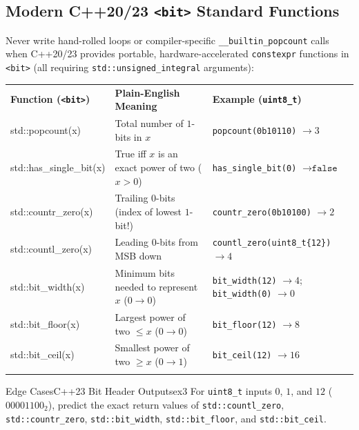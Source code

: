 \documentclass[11pt,a4paper]{article}
\theoremstyle{definition}
\begin{document}
\subsection{Modern C++20/23 \texttt{<bit>} Standard Functions}

Never write hand-rolled loops or compiler-specific \texttt{\_\_builtin\_popcount} calls when C++20/23 provides portable, hardware-accelerated \texttt{constexpr} functions in \texttt{<bit>} (all requiring \texttt{std::unsigned\_integral} arguments):

\begingroup\footnotesize{}
\begin{tabularx}{\textwidth}{>{\raggedright\arraybackslash\ttfamily}p{4.0cm} >{\raggedright\arraybackslash}X >{\raggedright\arraybackslash}p{4.6cm}}
\arrayrulecolor{primaryblue}\toprule[1.1pt]
\rowcolor{primaryblue!10}
\textcolor{primaryblue}{\textbf{\normalfont\bfseries Function (\texttt{<bit>})}} & \textcolor{primaryblue}{\textbf{Plain-English Meaning}} & \textcolor{primaryblue}{\textbf{Example (\texttt{uint8\_t})}} \\
\arrayrulecolor{codeframe}\midrule[0.6pt]
std::popcount(x) & Total number of $1$-bits in $x$ & \texttt{popcount(0b10110)} $\to 3$ \\
std::has\_single\_bit(x) & True iff $x$ is an exact power of two ($x > 0$) & \texttt{has\_single\_bit(0)} $\to \texttt{false}$ \\
std::countr\_zero(x) & Trailing $0$-bits (index of lowest $1$-bit!) & \texttt{countr\_zero(0b10100)} $\to 2$ \\
std::countl\_zero(x) & Leading $0$-bits from MSB down & \texttt{countl\_zero(uint8\_t\{12\})} $\to 4$ \\
std::bit\_width(x) & Minimum bits needed to represent $x$ ($0 \to 0$) & \texttt{bit\_width(12)} $\to 4$; \texttt{bit\_width(0)} $\to 0$ \\
std::bit\_floor(x) & Largest power of two $\le x$ ($0 \to 0$) & \texttt{bit\_floor(12)} $\to 8$ \\
std::bit\_ceil(x) & Smallest power of two $\ge x$ ($0 \to 1$) & \texttt{bit\_ceil(12)} $\to 16$ \\
\arrayrulecolor{primaryblue}\bottomrule[1.1pt]
\end{tabularx}\endgroup

\begin{tryitbox}{Edge Cases}{C++23 Bit Header Outputs}{ex3}
For \texttt{uint8\_t} inputs $0$, $1$, and $12$ ($00001100_2$), predict the exact return values of \texttt{std::countl\_zero}, \texttt{std::countr\_zero}, \texttt{std::bit\_width}, \texttt{std::bit\_floor}, and \texttt{std::bit\_ceil}.
\end{tryitbox}
\end{document}
